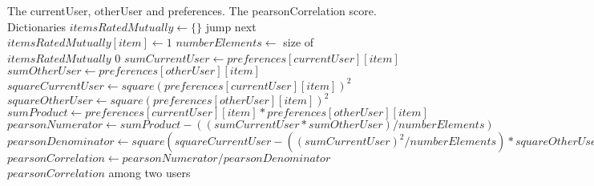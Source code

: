 \begin{algorithm}
\caption{Get Pearson correlation}
\begin{algorithmic} 
\REQUIRE The currentUser, otherUser and preferences.
\ENSURE The pearsonCorrelation score.
\STATE Dictionaries $itemsRatedMutually \leftarrow \{ \}$ 
\STATE jump next $itemsRatedMutually[item] \leftarrow 1$
\ENDIF
\ENDFOR
\STATE $numberElements \leftarrow $ size of $itemsRatedMutually$
\RETURN $0$
\ENDIF
{}
\STATE $sumCurrentUser \leftarrow preferences[currentUser][item]$
\STATE $sumOtherUser \leftarrow preferences[otherUser][item]$
\ENDFOR
{}
\STATE $squareCurrentUser \leftarrow square(preferences[currentUser][item])^2$
\STATE $squareOtherUser \leftarrow square(preferences[otherUser][item])^2$
\ENDFOR
{}
\STATE $sumProduct \leftarrow preferences[currentUser][item]*preferences[otherUser][item]$
\ENDFOR
\STATE $pearsonNumerator \leftarrow sumProduct-((sumCurrentUser*sumOtherUser)/numberElements)$
\STATE $pearsonDenominator \leftarrow square(squareCurrentUser-((sumCurrentUser)^2/numberElements)*squareOtherUser-((sumOtherUser)^2/numberElements))$
\STATE $pearsonCorrelation \leftarrow pearsonNumerator/pearsonDenominator$
\RETURN $pearsonCorrelation$ among two users
\end{algorithmic}
\end{algorithm}
